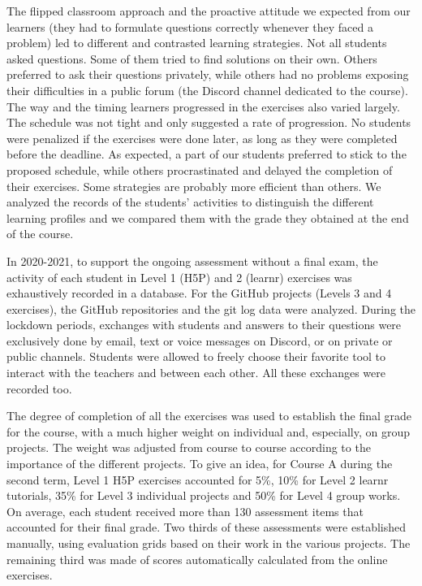 \documentclass{aims} %
\theoremstyle{definition}
\begin{document}
The flipped classroom approach and the proactive attitude we expected
from our learners (they had to formulate questions correctly whenever
they faced a problem) led to different and contrasted learning
strategies. Not all students asked questions. Some of them tried to find
solutions on their own. Others preferred to ask their questions
privately, while others had no problems exposing their difficulties in a
public forum (the Discord channel dedicated to the course). The way and
the timing learners progressed in the exercises also varied largely. The
schedule was not tight and only suggested a rate of progression. No
students were penalized if the exercises were done later, as long as
they were completed before the deadline. As expected, a part of our
students preferred to stick to the proposed schedule, while others
procrastinated and delayed the completion of their exercises. Some
strategies are probably more efficient than others. We analyzed the
records of the students' activities to distinguish the different
learning profiles and we compared them with the grade they obtained at
the end of the course.

In 2020-2021, to support the ongoing assessment without a final exam,
the activity of each student in Level 1 (H5P) and 2 (learnr) exercises
was exhaustively recorded in a database. For the GitHub projects (Levels
3 and 4 exercises), the GitHub repositories and the git log data were
analyzed. During the lockdown periods, exchanges with students and
answers to their questions were exclusively done by email, text or voice
messages on Discord, or on private or public channels. Students were
allowed to freely choose their favorite tool to interact with the
teachers and between each other. All these exchanges were recorded too.

The degree of completion of all the exercises was used to establish the
final grade for the course, with a much higher weight on individual and,
especially, on group projects. The weight was adjusted from course to
course according to the importance of the different projects. To give an
idea, for Course A during the second term, Level 1 H5P exercises
accounted for 5\%, 10\% for Level 2 learnr tutorials, 35\% for Level 3
individual projects and 50\% for Level 4 group works. On average, each
student received more than 130 assessment items that accounted for their
final grade. Two thirds of these assessments were established manually,
using evaluation grids based on their work in the various projects. The
remaining third was made of scores automatically calculated from the
online exercises.
\end{document}
